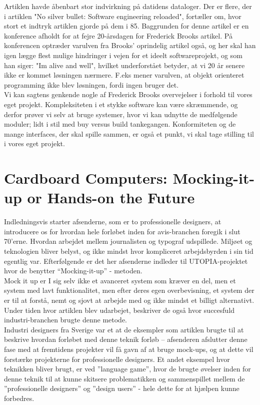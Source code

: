 \documentclass[12pt]{article}   %
\begin{document}
Artiklen havde åbenbart stor indvirkning på datidens dataloger. Der er flere, der i artiklen "No silver bullet: Software engineering reloaded", fortæller om, hvor stort et indtryk artiklen gjorde på dem i 85. Baggrunden for denne artikel er en konference afholdt for at fejre 20-årsdagen for Frederick Brooks artikel. På konferencen optræder varulven fra Brooks' oprindelig artikel også, og her skal han igen lægge flest mulige hindringer i vejen for et ideelt softwareprojekt, og som han siger: "Im alive and well", hvilket underforstået betyder, at vi 20 år senere ikke er kommet løsningen nærmere. F.eks mener varulven, at objekt orienteret programming ikke blev løsningen, fordi ingen bruger det. \\
Vi kan sagtens genkende nogle af Frederick Brooks overvejelser i forhold til vores eget projekt. Kompleksiteten i et stykke software kan være skræmmende, og derfor prøver vi selv at bruge systemer, hvor vi kan udnytte de medfølgende moduler; lidt i stil med buy versus build tankegangen. Konformiteten og de mange interfaces, der skal spille sammen, er også et punkt, vi skal tage stilling til i vores eget projekt.\\



\section{Cardboard Computers: Mocking-it-up or Hands-on the Future}
Indledningsvis starter afsenderne, som er to professionelle designers, at introducere os for hvordan hele forløbet inden for avis-branchen foregik i slut 70'erne. Hvordan arbejdet mellem journalisten og typograf udspillede. Miljøet og teknologien bliver belyst, og ikke mindst hvor kompliceret arbejdsbyrden i sin tid egentlig var. Efterfølgende  er det her afsenderne indleder til  UTOPIA-projektet hvor de benytter “Mocking-it-up” -  metoden.  \\ 
Mock it up er I sig selv ikke et avanceret system som kræver en del, men et system med lavt funktionalitet, men efter deres egen overbevisning, et system der er til at forstå, nemt og sjovt at arbejde med og ikke mindst et billigt alternativt. Under tiden hvor artiklen blev udarbejet, beskriver de også hvor succesfuld industri-branchen brugte denne metode. \\
Industri designers fra Sverige var et at de eksempler som artiklen brugte til at beskrive hvordan forløbet med denne teknik forløb – afsenderen afslutter denne fase med at fremtidens projekter vil få gavn af at bruge mock-ups, og at dette vil forstærke projekterne for professionelle designers. Et andet eksempel hvor teknikken bliver brugt, er ved ”language game”,  hvor de brugte øvelser inden for denne teknik til at kunne skitsere problematikken og sammenspillet mellem de ”professionelle designers” og ”design users”  - hele dette for at hjælpen kunne forbedres. \\
\end{document}
